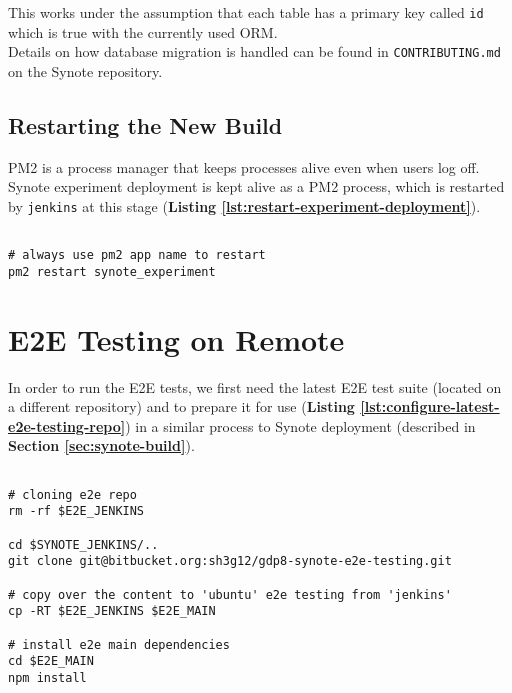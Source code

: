 This works under the assumption that each table has a primary key called \texttt{id} which is true with the currently used ORM.
\\

Details on how database migration is handled can be found in \texttt{CONTRIBUTING.md} on the Synote repository.

\subsection{Restarting the New Build}
\label{subsec:restarting-the-new-build}

PM2 is a process manager that keeps processes alive even when users log off. Synote experiment deployment is kept alive as a PM2 process, which is restarted by \texttt{jenkins} at this stage (\textbf{Listing \ref{lst:restart-experiment-deployment}}).\\

\begin{listing}[H]
\begin{verbatim}

# always use pm2 app name to restart
pm2 restart synote_experiment

\end{verbatim}
\label{lst:restart-experiment-deployment}
\end{listing}

\section{E2E Testing on Remote}
\label{subsec:e2e-testing-on-remote}

In order to run the E2E tests, we first need the latest E2E test suite (located on a different repository) and to prepare it for use (\textbf{Listing \ref{lst:configure-latest-e2e-testing-repo}}) in a similar process to Synote deployment (described in \textbf{Section \ref{sec:synote-build}}).\\

\begin{listing}[H]
\begin{verbatim}

# cloning e2e repo
rm -rf $E2E_JENKINS

cd $SYNOTE_JENKINS/..
git clone git@bitbucket.org:sh3g12/gdp8-synote-e2e-testing.git

# copy over the content to 'ubuntu' e2e testing from 'jenkins'
cp -RT $E2E_JENKINS $E2E_MAIN

# install e2e main dependencies
cd $E2E_MAIN
npm install

\end{verbatim}
\label{lst:configure-latest-e2e-testing-repo}
\end{listing}

